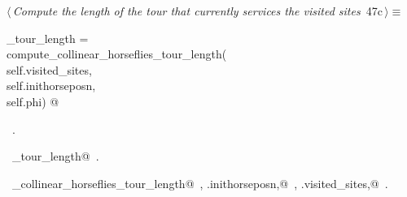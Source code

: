 \documentclass[11.5pt]{report}
\begin{document}
\vspace{-0.8cm}\newchunk 

\begin{flushleft} \small\label{scrap69}\raggedright\small
{} $\langle\,${\itshape Compute the length of the tour that currently services the visited sites}\nobreak\ {\footnotesize {47c}}$\,\rangle\equiv$
\vspace{-1ex}
\begin{list}{}{} \item
\mbox{}\verb@current_tour_length    = \@\\
\mbox{}\verb@         compute_collinear_horseflies_tour_length(\@\\
\mbox{}\verb@                    self.visited_sites,\@\\
\mbox{}\verb@                    self.inithorseposn,\@\\
\mbox{}\verb@                    self.phi) @\\
\mbox{}\verb@@{\NWsep}
\end{list}
\vspace{-1.5ex}
\footnotesize
\begin{list}{}{\setlength{\itemsep}{-\parsep}\setlength{\itemindent}{-\leftmargin}}
\item \NWtxtMacroRefIn\ .
\item \NWtxtIdentsDefed\nobreak\  \verb@current_tour_length@\nobreak\ .\item \NWtxtIdentsUsed\nobreak\  \verb@compute_collinear_horseflies_tour_length@\nobreak\ , \verb@self.inithorseposn,@\nobreak\ , \verb@self.visited_sites,@\nobreak\ .
\item{}
\end{list}
\vspace{4ex}
\end{flushleft}

\vspace{-0.8cm}\newchunk 
\end{document}
